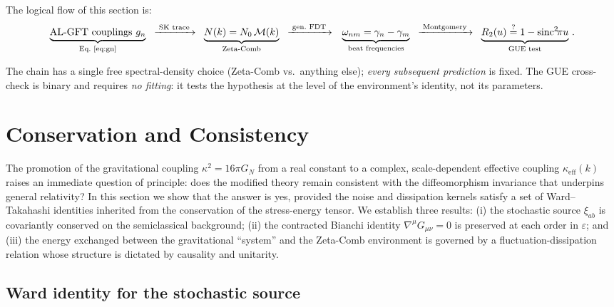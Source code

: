 \documentclass[12pt,a4paper]{article}
\begin{document}
The logical flow of this section is:
\[
  \underbrace{\text{AL-GFT couplings}~g_{n}}_%
    {\text{Eq.~\eqref{eq:gn}}}
  \;\;\xrightarrow{\;\text{SK trace}\;}
  \;\;\underbrace{N(k)=N_{0}\,\mathcal{M}(k)}_%
    {\text{Zeta-Comb}}
  \;\;\xrightarrow{\;\text{gen.\ FDT}\;}
  \\\;\;\underbrace{\omega_{nm}=\gamma_{n}-\gamma_{m}}_%
    {\text{beat frequencies}}

\;\;\xrightarrow{\;\text{Montgomery}\;}
  \;\;\underbrace{R_{2}(u)\stackrel{?}{=}1-\mathrm{sinc}^{2}\!\pi u}_%
    {\text{GUE test}}\,.
\]

\noindent
The chain has a single free spectral-density choice
(Zeta-Comb vs.\ anything else); \emph{every subsequent prediction}
is fixed.  The GUE cross-check is binary and requires \emph{no
  fitting}: it tests the hypothesis at the level of the
environment's identity, not its parameters.


\section{Conservation and Consistency}
\label{sec:conservation}

The promotion of the gravitational coupling $\kappa^2 = 16\pi G_N$ from a real constant
to a complex, scale-dependent effective coupling $\kappa_{\mathrm{eff}}(k)$ raises an
immediate question of principle: does the modified theory remain consistent with the
diffeomorphism invariance that underpins general relativity?  In this section we show
that the answer is yes, provided the noise and dissipation kernels satisfy a set of
Ward--Takahashi identities inherited from the conservation of the stress-energy tensor.
We establish three results: (i) the stochastic source $\xi_{ab}$ is covariantly
conserved on the semiclassical background; (ii) the contracted Bianchi identity
$\nabla^\mu G_{\mu\nu} = 0$ is preserved at each order in $\varepsilon$; and (iii) the
energy exchanged between the gravitational ``system'' and the Zeta-Comb environment is
governed by a fluctuation-dissipation relation whose structure is dictated by causality
and unitarity.

\subsection{Ward identity for the stochastic source}
\label{subsec:ward}
\end{document}
